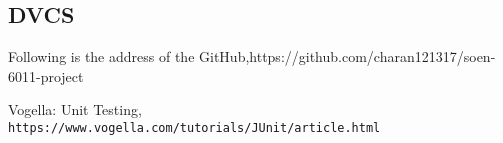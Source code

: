\documentclass[12pt]{article}
\begin{document}
\subsection*{DVCS}
Following is the address of the GitHub,\newline https://github.com/charan121317/soen-6011-project

\begin{thebibliography}{}

Vogella: Unit Testing,
\\\texttt{https://www.vogella.com/tutorials/JUnit/article.html}

\end{thebibliography}
\end{document}
